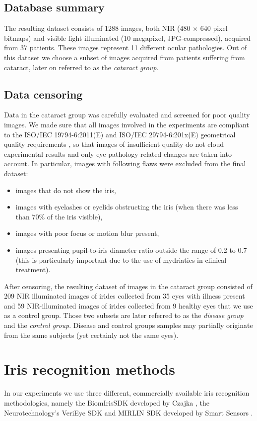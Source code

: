 \documentclass[a4paper]{spie}
\begin{document}
\subsection{Database summary}
The resulting dataset consists of 1288 images, both NIR (480 $\times$ 640 pixel bitmaps) and visible light illuminated (10 megapixel, JPG-compressed), acquired from 37 patients. These images represent 11 different ocular pathologies. Out of this dataset we choose a subset of images acquired from patients suffering from cataract, later on referred to as the \emph{cataract group}.

\subsection{Data censoring}
Data in the cataract group was carefully evaluated and screened for poor quality images. We made sure that all images involved in the experiments are compliant to the ISO/IEC 19794-6:2011(E) and ISO/IEC 29794-6:201x(E) geometrical quality requirements \cite{ISO, ISO2}, so that images of insufficient quality do not cloud experimental results and only eye pathology related changes are taken into account. In particular, images with  following flaws were excluded from the final dataset:
\begin{itemize}
\item images that do not show the iris,
\item images with eyelashes or eyelids obstructing the iris (when there was less than 70\% of the iris visible),
\item images with poor focus or motion blur present,
\item images presenting pupil-to-iris diameter ratio outside the range of 0.2 to 0.7 (this is particularly important due to the use of mydriatics in clinical treatment).
\end{itemize}

After censoring, the resulting dataset of images in the cataract group consisted of 209 NIR illuminated images of irides collected from 35 eyes with illness present and 59 NIR-illuminated images of irides collected from 9 healthy eyes that we use as a control group. Those two subsets are later referred to as the \emph{disease group} and the \emph{control group}. Disease and control groups samples may partially originate from the same subjects (yet certainly not the same eyes).

\section{Iris recognition methods}
In our experiments we use three different, commercially available iris recognition methodologies, namely the BiomIrisSDK developed by Czajka \cite{BiomIrisSDK, CzajkaPacut}, the Neurotechnology's VeriEye SDK \cite{VeriEye} and MIRLIN SDK developed by Smart Sensors \cite{MIRLIN}.
\end{document}
